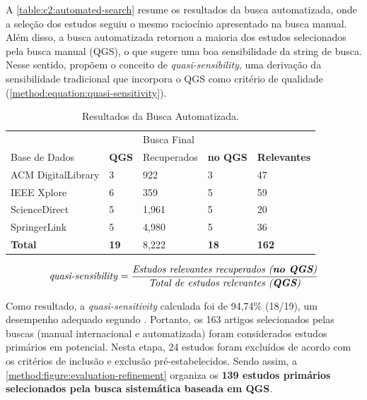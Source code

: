A \autoref{table:c2:automated-search} resume os resultados da busca automatizada, onde a seleção dos estudos seguiu o mesmo raciocínio apresentado na busca manual. Além disso, a busca automatizada retornou a maioria dos estudos selecionados pela busca manual (QGS), o que sugere uma boa sensibilidade da string de busca. Nesse sentido,  propõem o conceito de \textit{quasi-sensibility}, uma derivação da sensibilidade tradicional que incorpora o QGS como critério de qualidade (\autoref{method:equation:quasi-sensitivity}).

\begin{table}[htb]
\centering
\caption{Resultados da Busca Automatizada.}
\label{table:c2:automated-search}
\begin{tabular}{ll|lll} \hline
 &  & Busca Final &                 &                   \\ \cline{3-5} 
Base de Dados & \textbf{QGS} & Recuperados    & \textbf{no QGS} & \textbf{Relevantes} \\ \hline
ACM DigitalLibrary & 3            & 922          & 3               & 47                \\
IEEE Xplore        & 6            & 359          & 5               & 59                \\
ScienceDirect      & 5            & 1,961        & 5               & 20                \\
SpringerLink       & 5            & 4,980        & 5               & 36                \\ \hline
\multicolumn{1}{l}{\textbf{Total}}   & \textbf{19}  & 8,222        & \textbf{18}     & \textbf{162}      \\ \hline
\end{tabular}
\end{table}

\begin{equation}
\label{method:equation:quasi-sensitivity}
\text{\textit{quasi-sensibility}} = \frac{\text{\textit{Estudos relevantes recuperados (\textbf{no QGS})}}}{\text{\textit{Total de estudos relevantes (\textbf{QGS})}}}
\end{equation}

Como resultado, a \textit{quasi-sensitivity} calculada foi de 94,74\% (18/19), um desempenho adequado segundo . Portanto, os 163 artigos selecionados pelas buscas (manual internacional e automatizada) foram considerados estudos primários em potencial. Nesta etapa, 24 estudos foram excluídos de acordo com os critérios de inclusão e exclusão pré-estabelecidos. Sendo assim, a \autoref{method:figure:evaluation-refinement} organiza os \textbf{139 estudos primários selecionados pela busca sistemática baseada em QGS}.

